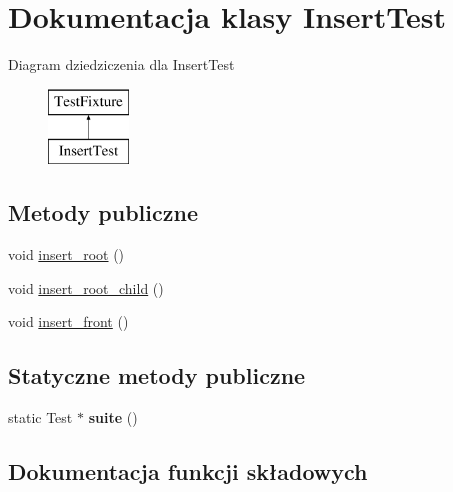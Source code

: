 \hypertarget{class_insert_test}{}\section{Dokumentacja klasy Insert\+Test}
\label{class_insert_test}
Diagram dziedziczenia dla Insert\+Test\begin{figure}[H]
\begin{center}
\leavevmode
\includegraphics[height=2.000000cm]{class_insert_test}
\end{center}
\end{figure}
\subsection*{Metody publiczne}
\begin{DoxyCompactItemize}
\item 
void \hyperlink{class_insert_test_a08b1a1c6b86e528795c49c20e019d701}{insert\+\_\+root} ()
\item 
void \hyperlink{class_insert_test_a0bab461bf75465f1f23a21a962266389}{insert\+\_\+root\+\_\+child} ()
\item 
void \hyperlink{class_insert_test_aed04f1b62d643e9d6bfa713930a1805b}{insert\+\_\+front} ()
\end{DoxyCompactItemize}
\subsection*{Statyczne metody publiczne}
\begin{DoxyCompactItemize}
\item 
\mbox{\label{class_insert_test_aebbf65f804a3b4af0545dc32211925a5}} 
static Test $\ast$ {\bfseries suite} ()
\end{DoxyCompactItemize}


\subsection{Dokumentacja funkcji składowych}
\mbox{\label{class_insert_test_aed04f1b62d643e9d6bfa713930a1805b}} 
